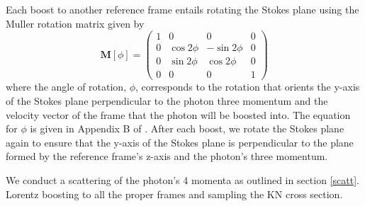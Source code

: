 \documentclass[12pt,a4paper]{article}
\begin{document}
Each boost to another reference frame entails rotating the Stokes plane using the Muller rotation matrix \citep{McMaster:1961aa} given by
\begin{equation}
\mathbf{M}[\phi]=\left(\begin{array}{cccc}{1} & {0} & {0} & {0} \\ {0} & {\cos 2 \phi} & {-\sin 2 \phi} & {0} \\ {0} & {\sin 2 \phi} & {\cos 2 \phi} & {0} \\ {0} & {0} & {0} & {1}\end{array}\right)
\end{equation}
where the angle of rotation, $\phi$, corresponds to the rotation that orients the y-axis of the Stokes plane perpendicular to the photon three momentum and the velocity vector of the frame that the photon will be boosted into. The equation for $\phi$ is given in Appendix B of \cite{lundman2014polarization}. After each boost, we rotate the Stokes plane again to ensure that the y-axis of the Stokes plane is perpendicular to the plane formed by the reference frame's z-axis and the photon's three momentum.

We conduct a scattering of the photon's 4 momenta as outlined in section \ref{scatt}. Lorentz boosting to all the proper frames and sampling the KN cross section. 
\end{document}
